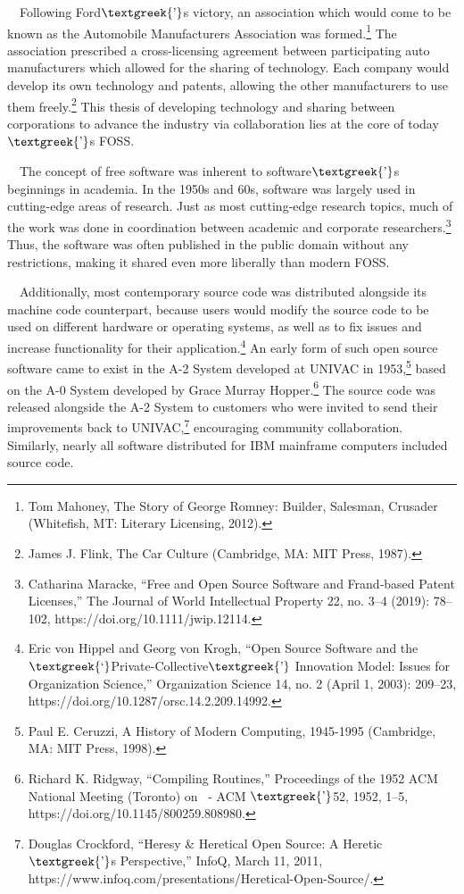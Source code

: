 \documentclass{article}
\begin{document}
\ \ Following Ford$\text{\textgreek{’}}$s victory, an association which would come to be known as the Automobile
Manufacturers Association was formed.\footnote{Tom Mahoney, The Story of George Romney: Builder, Salesman, Crusader
(Whitefish, MT: Literary Licensing, 2012).} The association prescribed a cross-licensing agreement between
participating auto manufacturers which allowed for the sharing of technology. Each company would develop its own
technology and patents, allowing the other manufacturers to use them freely.\footnote{James J. Flink, The Car Culture
(Cambridge, MA: MIT Press, 1987).} This thesis of developing technology and sharing between corporations to advance the
industry via collaboration lies at the core of today$\text{\textgreek{’}}$s FOSS.

\ \ The concept of free software was inherent to software$\text{\textgreek{’}}$s beginnings in academia. In the 1950s
and 60s, software was largely used in cutting-edge areas of research. Just as most cutting-edge research topics, much
of the work was done in coordination between academic and corporate researchers.\footnote{Catharina Maracke, “Free and
Open Source Software and Frand‐based Patent Licenses,” The Journal of World Intellectual Property 22, no. 3–4 (2019):
78–102, https://doi.org/10.1111/jwip.12114.} Thus, the software was often published in the public domain without any
restrictions, making it shared even more liberally than modern FOSS. 

\ \ Additionally, most contemporary source code was distributed alongside its machine code counterpart, because users
would modify the source code to be used on different hardware or operating systems, as well as to fix issues and
increase functionality for their application.\footnote{Eric von Hippel and Georg von Krogh, “Open Source Software and
the $\text{\textgreek{‘}}$Private-Collective$\text{\textgreek{’}}$ Innovation Model: Issues for Organization Science,”
Organization Science 14, no. 2 (April 1, 2003): 209–23, https://doi.org/10.1287/orsc.14.2.209.14992.} An early form of
such open source software came to exist in the A-2 System developed at UNIVAC in 1953,\footnote{Paul E. Ceruzzi, A
History of Modern Computing, 1945-1995 (Cambridge, MA: MIT Press, 1998).} based on the A-0 System developed by Grace
Murray Hopper.\footnote{Richard K. Ridgway, “Compiling Routines,” Proceedings of the 1952 ACM National Meeting
(Toronto) on  - ACM $\text{\textgreek{’}}$52, 1952, 1–5, https://doi.org/10.1145/800259.808980.} The source code was
released alongside the A-2 System to customers who were invited to send their improvements back to
UNIVAC,\footnote{Douglas Crockford, “Heresy \& Heretical Open Source: A Heretic$\text{\textgreek{’}}$s Perspective,”
InfoQ, March 11, 2011, https://www.infoq.com/presentations/Heretical-Open-Source/.} encouraging community
collaboration. Similarly, nearly all software distributed for IBM mainframe computers included source code.
\end{document}
